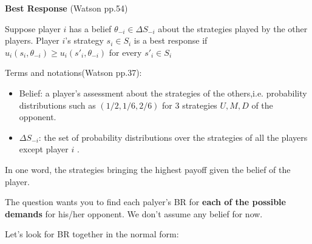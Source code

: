 \documentclass{article}
\begin{document}
\begin{mdframed}[backgroundcolor=blue!20,linecolor=white]
\textbf{Best Response} (Watson pp.54)

Suppose player $i$ has a belief $\theta_{−i} \in \Delta S_{−i}$ about the strategies played
by the other players. Player $i$'s strategy $s_i \in S_i$ is a best response if
$u_i (s_i , \theta_{−i} ) \ge u_i (s'_i , \theta_{−i})$ for every $s'_i \in S_i$

\vspace{4mm}

Terms and notations(Watson pp.37):
\begin{itemize}
\item Belief: a player's assessment about the strategies of the others,i.e. probability distributions such as $(1/2,1/6,2/6)$ for 3 strategies $U,M,D$ of the opponent.
\item $\Delta S_{−i}$: the set of probability distributions over the strategies of all the players except player $i$ .
\end{itemize}

In one word, the strategies bringing the highest payoff given the belief of the player.

\vspace{4mm}

The question wants you to find each palyer's  BR for \textbf{each of the possible demands} for his/her opponent.
We don't assume any belief for now.

\newpage

Let's look for BR together in the normal form:


\end{mdframed}
\end{document}
